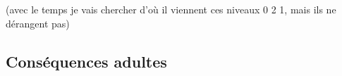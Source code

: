 \documentclass[
]{article}
\newenvironment{Shaded}{\begin{snugshade}}{\end{snugshade}}
\newcommand{\CommentTok}[1]{\textcolor[rgb]{0.56,0.35,0.01}{\textit{#1}}}
\begin{document}
\begin{Shaded}
\end{Shaded}

(avec le temps je vais chercher d'où il viennent ces niveaux 0 2 1, mais
ils ne dérangent pas)

\hypertarget{consuxe9quences-adultes}{%
\subsection{Conséquences adultes}\label{consuxe9quences-adultes}}
\end{document}
